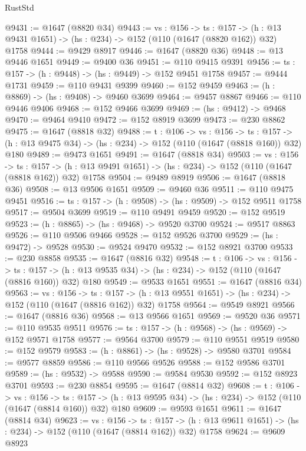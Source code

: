 \begin{lexlean}{RustStd}
\begin{coremodule}
@9431 := @1647 (@8820 @34)
@9443 := {vs : @156} ->
  {ts : @157} -> (h : @13 @9431 @1651) -> (hs : @234) -> @152 (@110 (@1647 (@8820 @162)) @32) @1758
@9444 := @9429 @8917
@9446 := @1647 (@8820 @36)
@9448 := @13 @9446 @1651
@9449 := @9400 @36
@9451 := @110 @9415 @9391
@9456 := {ts : @157} -> (h : @9448) -> (hs : @9449) -> @152 @9451 @1758
@9457 := @9444 @1731
@9459 := @110 @9431 @9399
@9460 := @152 @9459
@9463 := (h : @8869) -> (hs : @9408) -> @9460 @3699
@9464 := @9457 @8867
@9466 := @110 @9446 @9406
@9468 := @152 @9466 @3699
@9469 := (hs : @9412) -> @9468
@9470 := @9464 @9410
@9472 := @152 @8919 @3699
@9473 := @230 @8862
@9475 := @1647 (@8818 @32)
@9488 := {t : @106} ->
  {vs : @156} ->
  {ts : @157} -> (h : @13 @9475 @34) -> (hs : @234) -> @152 (@110 (@1647 (@8818 @160)) @32) @180
@9489 := @9473 @1651
@9491 := @1647 (@8818 @34)
@9503 := {vs : @156} ->
  {ts : @157} -> (h : @13 @9491 @1651) -> (hs : @234) -> @152 (@110 (@1647 (@8818 @162)) @32) @1758
@9504 := @9489 @8919
@9506 := @1647 (@8818 @36)
@9508 := @13 @9506 @1651
@9509 := @9460 @36
@9511 := @110 @9475 @9451
@9516 := {ts : @157} -> (h : @9508) -> (hs : @9509) -> @152 @9511 @1758
@9517 := @9504 @3699
@9519 := @110 @9491 @9459
@9520 := @152 @9519
@9523 := (h : @8865) -> (hs : @9468) -> @9520 @3700
@9524 := @9517 @8863
@9526 := @110 @9506 @9466
@9528 := @152 @9526 @3700
@9529 := (hs : @9472) -> @9528
@9530 := @9524 @9470
@9532 := @152 @8921 @3700
@9533 := @230 @8858
@9535 := @1647 (@8816 @32)
@9548 := {t : @106} ->
  {vs : @156} ->
  {ts : @157} -> (h : @13 @9535 @34) -> (hs : @234) -> @152 (@110 (@1647 (@8816 @160)) @32) @180
@9549 := @9533 @1651
@9551 := @1647 (@8816 @34)
@9563 := {vs : @156} ->
  {ts : @157} -> (h : @13 @9551 @1651) -> (hs : @234) -> @152 (@110 (@1647 (@8816 @162)) @32) @1758
@9564 := @9549 @8921
@9566 := @1647 (@8816 @36)
@9568 := @13 @9566 @1651
@9569 := @9520 @36
@9571 := @110 @9535 @9511
@9576 := {ts : @157} -> (h : @9568) -> (hs : @9569) -> @152 @9571 @1758
@9577 := @9564 @3700
@9579 := @110 @9551 @9519
@9580 := @152 @9579
@9583 := (h : @8861) -> (hs : @9528) -> @9580 @3701
@9584 := @9577 @8859
@9586 := @110 @9566 @9526
@9588 := @152 @9586 @3701
@9589 := (hs : @9532) -> @9588
@9590 := @9584 @9530
@9592 := @152 @8923 @3701
@9593 := @230 @8854
@9595 := @1647 (@8814 @32)
@9608 := {t : @106} ->
  {vs : @156} ->
  {ts : @157} -> (h : @13 @9595 @34) -> (hs : @234) -> @152 (@110 (@1647 (@8814 @160)) @32) @180
@9609 := @9593 @1651
@9611 := @1647 (@8814 @34)
@9623 := {vs : @156} ->
  {ts : @157} -> (h : @13 @9611 @1651) -> (hs : @234) -> @152 (@110 (@1647 (@8814 @162)) @32) @1758
@9624 := @9609 @8923

\end{coremodule}
\end{lexlean}
